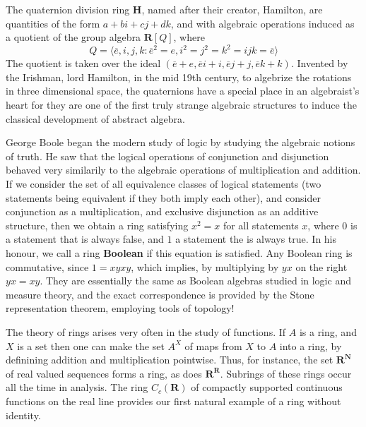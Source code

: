 \begin{example}
    The quaternion division ring $\mathbf{H}$, named after their creator, Hamilton, are quantities of the form $a + bi + cj + dk$, and with algebraic operations induced as a quotient of the group algebra $\mathbf{R}[Q]$, where
    \[ Q = \langle \overline{e}, i,j,k : \overline{e}^2 = e, i^2 = j^2 = k^2 = ijk = \overline{e} \rangle \]
    The quotient is taken over the ideal $(\overline{e} + e, \overline{e}i + i, \overline{e}j + j, \overline{e}k + k)$. Invented by the Irishman, lord Hamilton, in the mid 19th century, to algebrize the rotations in three dimensional space, the quaternions have a special place in an algebraist's heart for they are one of the first truly strange algebraic structures to induce the classical development of abstract algebra.
\end{example}

\begin{example}
    George Boole began the modern study of logic by studying the algebraic notions of truth. He saw that the logical operations of conjunction and disjunction behaved very similarily to the algebraic operations of multiplication and addition. If we consider the set of all equivalence classes of logical statements (two statements being equivalent if they both imply each other), and consider conjunction as a multiplication, and exclusive disjunction as an additive structure, then we obtain a ring satisfying $x^2 = x$ for all statements $x$, where $0$ is a statement that is always false, and $1$ a statement the is always true. In his honour, we call a ring {\bf Boolean} if this equation is satisfied. Any Boolean ring is commutative, since $1 = xyxy$, which implies, by multiplying by $yx$ on the right $yx = xy$. They are essentially the same as Boolean algebras studied in logic and measure theory, and the exact correspondence is provided by the Stone representation theorem, employing tools of topology!
\end{example}

\begin{example}
    The theory of rings arises very often in the study of functions. If $A$ is a ring, and $X$ is a set then one can make the set $A^X$ of maps from $X$ to $A$ into a ring, by definining addition and multiplication pointwise. Thus, for instance, the set $\mathbf{R}^{\mathbf{N}}$ of real valued sequences forms a ring, as does $\mathbf{R}^{\mathbf{R}}$. Subrings of these rings occur all the time in analysis. The ring $C_c(\mathbf{R})$ of compactly supported continuous functions on the real line provides our first natural example of a ring without identity.
\end{example}

